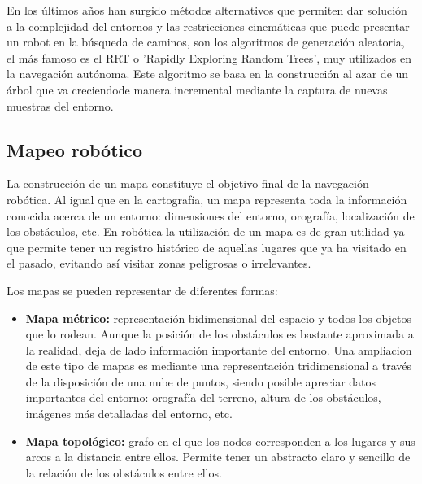 En los últimos años han surgido métodos alternativos que permiten dar solución a
la complejidad del entornos y las restricciones cinemáticas que puede presentar
un robot en la búsqueda de caminos, son los algoritmos de generación aleatoria,
el más famoso es el RRT o 'Rapidly Exploring Random Trees', muy utilizados en la
navegación autónoma. Este algoritmo se basa en la construcción al azar de un 
árbol que va creciendode manera incremental mediante la captura de nuevas
muestras del entorno.

\subsection{Mapeo robótico}

La construcción de un mapa constituye el objetivo final de la navegación
robótica. Al igual que en la cartografía, un mapa representa toda la información
conocida acerca de un entorno: dimensiones del entorno, orografía, localización
de los obstáculos, etc. En robótica la utilización de un mapa es de gran
utilidad ya que permite tener un registro histórico de aquellas lugares que ya
ha visitado en el pasado, evitando así visitar zonas peligrosas o irrelevantes.

Los mapas se pueden representar de diferentes formas:

\begin{itemize}
  \item \textbf{Mapa métrico:} representación bidimensional del espacio y todos
  los objetos que lo rodean. Aunque la posición de los obstáculos es bastante
  aproximada a la realidad, deja de lado información importante del entorno. Una
  ampliacion de este tipo de mapas es mediante una representación tridimensional
  a través de la disposición de una nube de puntos, siendo posible apreciar
  datos  importantes del entorno: orografía del terreno, altura de los
  obstáculos, imágenes más detalladas del entorno, etc.
  \item \textbf{Mapa topológico:} grafo en el que los nodos corresponden a los
  lugares y sus arcos a la distancia entre ellos. Permite tener un abstracto
  claro y sencillo de la relación de los obstáculos entre ellos.
\end{itemize}

